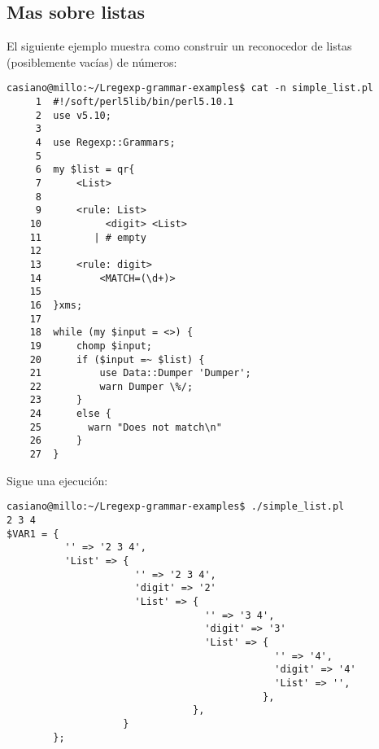 \subsection{Mas sobre listas}




El siguiente ejemplo muestra como construir un reconocedor de 
listas (posiblemente vacías) de números:
\begin{verbatim}
casiano@millo:~/Lregexp-grammar-examples$ cat -n simple_list.pl
     1  #!/soft/perl5lib/bin/perl5.10.1
     2  use v5.10;
     3
     4  use Regexp::Grammars;
     5
     6  my $list = qr{
     7      <List>
     8
     9      <rule: List>
    10           <digit> <List>
    11         | # empty
    12
    13      <rule: digit>
    14          <MATCH=(\d+)>
    15
    16  }xms;
    17
    18  while (my $input = <>) {
    19      chomp $input;
    20      if ($input =~ $list) {
    21          use Data::Dumper 'Dumper';
    22          warn Dumper \%/;
    23      }
    24      else {
    25        warn "Does not match\n"
    26      }
    27  }
\end{verbatim}
Sigue una ejecución:
\begin{verbatim}
casiano@millo:~/Lregexp-grammar-examples$ ./simple_list.pl
2 3 4
$VAR1 = {
          '' => '2 3 4',
          'List' => {
                      '' => '2 3 4',
                      'digit' => '2'
                      'List' => {
                                  '' => '3 4',
                                  'digit' => '3'
                                  'List' => {
                                              '' => '4',
                                              'digit' => '4'
                                              'List' => '',
                                            },
                                },
                    }
        };
\end{verbatim}


